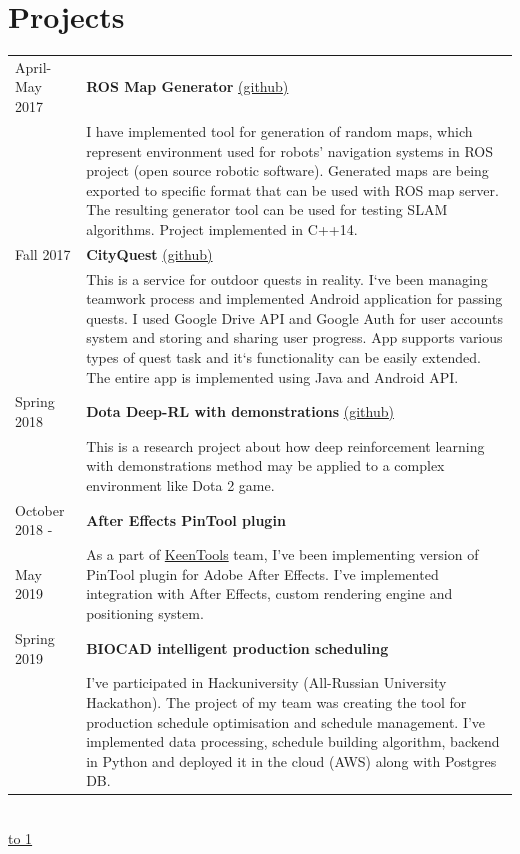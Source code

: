 \documentclass[10pt]{article}
\def\LINE{\vspace*{-1em}\noindent \underline{\hbox to 1\textwidth{{ } \hfil{ } \hfil{ } }}}
\begin{document}
\section*{\color{accent} Projects}
\begin{tabular}{p{2.5cm}|p{14.7cm}}
  April-May 2017 \  & \textbf{ROS Map Generator} \href{https://github.com/karvozavr/ROS-Map-Generator}{\scriptsize (github)} \\
  & \footnotesize{I have implemented tool for generation of random maps, which represent environment used for robots' navigation systems in ROS project (open source robotic software). Generated maps are being exported to specific format that can be used with ROS map server. The resulting generator tool can be used for testing SLAM algorithms. Project implemented in \textsc{C++14}.}  \\
  Fall 2017  & \textbf{CityQuest} \href{https://github.com/karvozavr/CityQuest/tree/dev}{\scriptsize (github)} \\
  & \footnotesize{This is a service for outdoor quests in reality. I`ve been managing teamwork process and implemented Android application for passing quests. I used Google Drive API and Google Auth for user accounts system and storing and sharing user progress. 
    App supports various types of quest task and it`s functionality can be easily extended. The entire app is implemented using Java and Android API.}   \\
  Spring 2018 & \textbf{Dota Deep-RL with demonstrations} \href{https://github.com/karvozavr/DotA-DeepRL}{\scriptsize (github)} \\
  & \footnotesize{This is a research project about how deep reinforcement learning with demonstrations method may be applied to a complex environment like Dota 2 game.}   \\
    October 2018 - & \textbf{After Effects PinTool plugin} \\
  May 2019 & \footnotesize{As a part of \href{https://www.keentools.io/}{KeenTools} team, I've been implementing version of PinTool plugin for Adobe After Effects. I've implemented integration with After Effects, custom rendering engine and positioning system.} \\
  Spring 2019 & \textbf{BIOCAD intelligent production scheduling} \\
  & \footnotesize{I've participated in Hackuniversity (All-Russian University Hackathon). The project of my team was creating the tool for production schedule optimisation and schedule management. I've implemented data processing, schedule building algorithm, backend in Python and deployed it in the cloud (AWS) along with Postgres DB.}  
\end{tabular}
\\
\LINE
\end{document}
